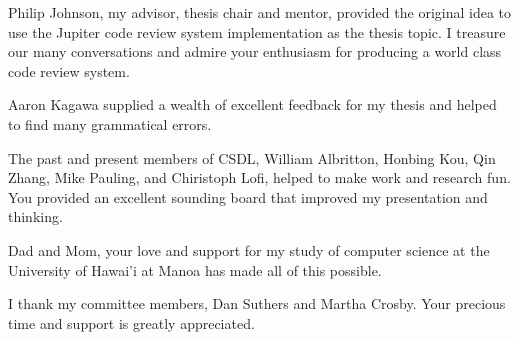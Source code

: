 
\begin{acknowledgements}

Philip Johnson, my advisor, thesis chair and mentor, provided the original idea to use the Jupiter code review system implementation as the thesis topic. I treasure our many conversations and admire your enthusiasm for producing a world class code review system.

Aaron Kagawa supplied a wealth of excellent feedback for my thesis and helped to find many grammatical errors.

The past and present members of CSDL, William Albritton, Honbing Kou, Qin Zhang, Mike Pauling, and Chiristoph Lofi, helped to make work and research fun. You provided an excellent sounding board that improved my presentation and thinking.

Dad and Mom, your love and support for my study of computer science at the University of Hawai'i at Manoa has made all of this possible.

I thank my committee members, Dan Suthers and Martha Crosby. Your precious time and support is greatly appreciated.

\end{acknowledgements}

